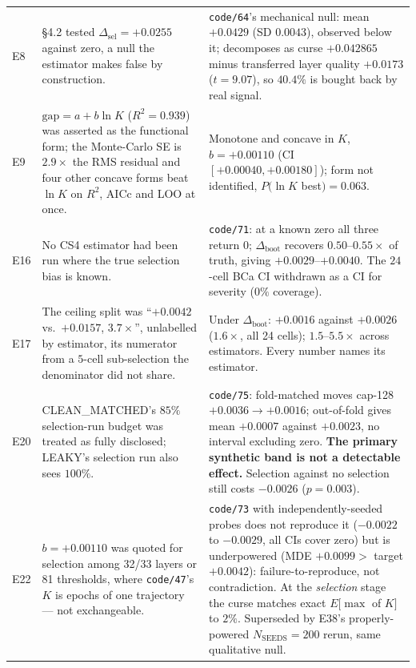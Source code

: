 \documentclass[10pt]{article} %
\begin{document}
\begin{longtable}{@{}p{}p{}p{}@{}}
E8 & §4.2 tested $\Delta_{\text{sel}}=+0.0255$ against zero, a null the estimator makes false by construction. &
\texttt{code/64}'s mechanical null: mean $+0.0429$ (SD $0.0043$), observed below it; decomposes as curse $+0.042865$ minus transferred layer quality $+0.0173$ ($t=9.07$), so $40.4\%$ is bought back by real signal. \\

E9 & $\text{gap}=a+b\ln K$ ($R^2=0.939$) was asserted as the functional form; the Monte-Carlo SE is $2.9\times$ the RMS residual and four other concave forms beat $\ln K$ on $R^2$, AICc and LOO at once. &
Monotone and concave in $K$, $b=+0.00110$ (CI $[+0.00040,+0.00180]$); form not identified, $P(\ln K$ best$)=0.063$. \\

E16 & No CS4 estimator had been run where the true selection bias is known. &
\texttt{code/71}: at a known zero all three return $0$; $\Delta_{\text{boot}}$ recovers $0.50$--$0.55\times$ of truth, giving $+0.0029$--$+0.0040$. The $24$-cell BCa CI withdrawn as a CI for severity ($0\%$ coverage). \\

E17 & The ceiling split was ``$+0.0042$ vs.\ $+0.0157$, $3.7\times$'', unlabelled by estimator, its numerator from a $5$-cell sub-selection the denominator did not share. &
Under $\Delta_{\text{boot}}$: $+0.0016$ against $+0.0026$ ($1.6\times$, all 24 cells); $1.5$--$5.5\times$ across estimators. Every number names its estimator. \\

E20 & CLEAN\_MATCHED's $85\%$ selection-run budget was treated as fully disclosed; LEAKY's selection run also sees $100\%$. &
\texttt{code/75}: fold-matched moves cap-128 $+0.0036\to+0.0016$; out-of-fold gives mean $+0.0007$ against $+0.0023$, no interval excluding zero. \textbf{The primary synthetic band is not a detectable effect.} Selection against no selection still costs $-0.0026$ ($p=0.003$). \\

E22 & $b=+0.00110$ was quoted for selection among 32/33 layers or 81 thresholds, where \texttt{code/47}'s $K$ is epochs of one trajectory --- not exchangeable. &
\texttt{code/73} with independently-seeded probes does not reproduce it ($-0.0022$ to $-0.0029$, all CIs cover zero) but is underpowered (MDE $+0.0099>$ target $+0.0042$): failure-to-reproduce, not contradiction. At the \emph{selection} stage the curse matches exact $E[\max$ of $K]$ to $2\%$. Superseded by E38's properly-powered $N_{\text{SEEDS}}=200$ rerun, same qualitative null. \\


\end{longtable}
\end{document}
